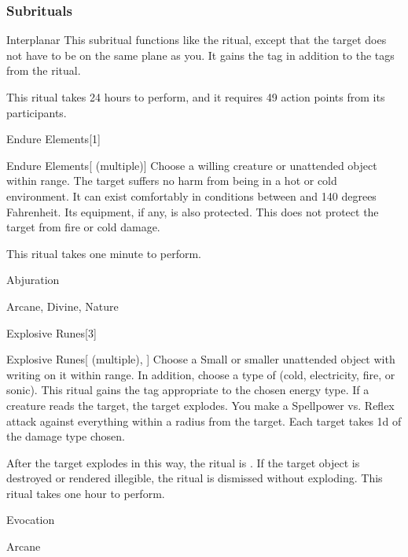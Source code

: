 \subsubsection{Subrituals}


\begin{ability}[\nth{7}]{Interplanar}
This subritual functions like the  ritual, except that the target does not have to be on the same plane as you.
It gains the  tag in addition to the tags from the  ritual.

This ritual takes 24 hours to perform, and it requires 49 action points from its participants.
\end{ability}
\vspace{0.25em}


\begin{spellsection}{Endure Elements}[1]


\begin{ability}{Endure Elements}[ (multiple)]
Choose a willing creature or unattended object within \rngclose range.
The target suffers no harm from being in a hot or cold environment.
It can exist comfortably in conditions between  and 140 degrees Fahrenheit.
Its equipment, if any, is also protected.
This does not protect the target from fire or cold damage.

This ritual takes one minute to perform.
\end{ability}




 Abjuration

 Arcane, Divine, Nature
\end{spellsection}


\begin{spellsection}{Explosive Runes}[3]


\begin{ability}{Explosive Runes}[ (multiple), ]
Choose a Small or smaller unattended object with writing on it within \rngclose range.
In addition, choose a type of  (cold, electricity, fire, or sonic).
This ritual gains the tag appropriate to the chosen energy type.
If a creature reads the target, the target explodes.
You make a Spellpower vs. Reflex attack against everything within a \areamed radius from the target.
\hit Each target takes  \minus1d of the damage type chosen.

After the target explodes in this way, the ritual is .
If the target object is destroyed or rendered illegible, the ritual is dismissed without exploding.
This ritual takes one hour to perform.
\end{ability}




 Evocation

 Arcane
\end{spellsection}


